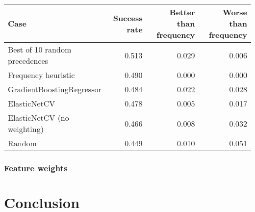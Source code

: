 \begin{tabular}{lrrr}
	Case & Success rate & Better than frequency & Worse than frequency \\
	\hline
	Best of 10 random precedences & 0.513 & 0.029 & 0.006 \\
	Frequency heuristic & 0.490 & 0.000 & 0.000 \\
	GradientBoostingRegressor & 0.484 & 0.022 & 0.028 \\
	ElasticNetCV & 0.478 & 0.005 & 0.017 \\
	ElasticNetCV (no weighting) & 0.466 & 0.008 & 0.032 \\
	Random & 0.449 & 0.010 & 0.051 \\
\end{tabular}


\subsubsection{Feature weights}


\section{Conclusion}


\glsaddall
\printglossaries





